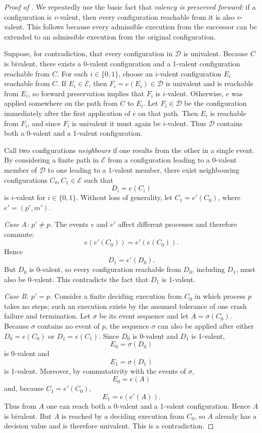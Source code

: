 \begin{proof}[Proof of ]
We repeatedly use the basic fact that \emph{valency is preserved forward}: if a configuration is $v$-valent, then every configuration reachable from it is also $v$-valent. This follows because every admissible execution from the successor can be extended to an admissible execution from the original configuration.

Suppose, for contradiction, that every configuration in $\mathcal{D}$ is univalent. Because $C$ is bivalent, there exists a 0-valent configuration and a 1-valent configuration reachable from $C$. For each $i\in\{0,1\}$, choose an $i$-valent configuration $E_i$ reachable from $C$. If $E_i\in\mathcal{E}$, then $F_i=e(E_i)\in\mathcal{D}$ is univalent and is reachable from $E_i$, so forward preservation implies that $F_i$ is $i$-valent. Otherwise, $e$ was applied somewhere on the path from $C$ to $E_i$. Let $F_i\in\mathcal{D}$ be the configuration immediately after the first application of $e$ on that path. Then $E_i$ is reachable from $F_i$, and since $F_i$ is univalent it must again be $i$-valent. Thus $\mathcal{D}$ contains both a 0-valent and a 1-valent configuration.

Call two configurations \emph{neighbours} if one results from the other in a single event. By considering a finite path in $\mathcal{E}$ from a configuration leading to a 0-valent member of $\mathcal{D}$ to one leading to a 1-valent member, there exist neighbouring configurations $C_0,C_1\in\mathcal{E}$ such that
\[
D_i=e(C_i)
\]
is $i$-valent for $i\in\{0,1\}$. Without loss of generality, let $C_1=e'(C_0)$, where $e'=(p',m')$.

\emph{Case A: $p'\ne p$.} The events $e$ and $e'$ affect different processes and therefore commute:
\[
e(e'(C_0))=e'(e(C_0)).
\]
Hence
\[
D_1=e'(D_0).
\]
But $D_0$ is 0-valent, so every configuration reachable from $D_0$, including $D_1$, must also be 0-valent. This contradicts the fact that $D_1$ is 1-valent.

\emph{Case B: $p'=p$.} Consider a finite deciding execution from $C_0$ in which process $p$ takes no steps; such an execution exists by the assumed tolerance of one crash failure and termination. Let $\sigma$ be its event sequence and let $A=\sigma(C_0)$. Because $\sigma$ contains no event of $p$, the sequence $\sigma$ can also be applied after either $D_0=e(C_0)$ or $D_1=e(C_1)$. Since $D_0$ is 0-valent and $D_1$ is 1-valent,
\[
E_0=\sigma(D_0)
\]
is 0-valent and
\[
E_1=\sigma(D_1)
\]
is 1-valent. Moreover, by commutativity with the events of $\sigma$,
\[
E_0=e(A)
\]
and, because $C_1=e'(C_0)$,
\[
E_1=e(e'(A)).
\]
Thus from $A$ one can reach both a 0-valent and a 1-valent configuration. Hence $A$ is bivalent. But $A$ is reached by a deciding execution from $C_0$, so $A$ already has a decision value and is therefore univalent. This is a contradiction.


\end{proof}
